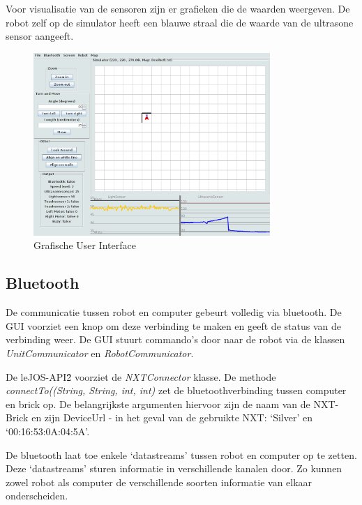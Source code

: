 \documentclass[tt3]{penoverslag}
\begin{document}
Voor visualisatie van de sensoren zijn er grafieken die de waarden weergeven. De robot zelf op de simulator heeft een blauwe straal die de waarde van de ultrasone sensor aangeeft. 

\begin{figure}[tbp]
\begin{center}
    \includegraphics[width=0.8\textwidth]{GUI}
    \caption{Grafische User Interface}
	\label{fig:gui}
\end{center}
\end{figure}

\subsection{Bluetooth} %
\label{ssec:bluetooth}
De communicatie tussen robot en computer gebeurt volledig via bluetooth. De GUI voorziet een knop om deze verbinding te maken en geeft de status van de verbinding weer. De GUI stuurt commando's door naar de robot via de klassen \textit{UnitCommunicator} en \textit{RobotCommunicator}.

De leJOS-API\^{2} voorziet de \textit{NXTConnector} klasse. De methode \textit{connectTo((String, String, int, int)} zet de bluetoothverbinding tussen computer en brick op. De belangrijkste argumenten hiervoor zijn de naam van de NXT-Brick en zijn DeviceUrl  - in het geval van de gebruikte NXT: `Silver' en `00:16:53:0A:04:5A'.

De bluetooth laat toe enkele `datastreams' tussen robot en computer op te zetten. Deze `datastreams' sturen informatie in verschillende kanalen door. Zo kunnen zowel robot als computer de verschillende soorten informatie van elkaar onderscheiden.

\end{document}

